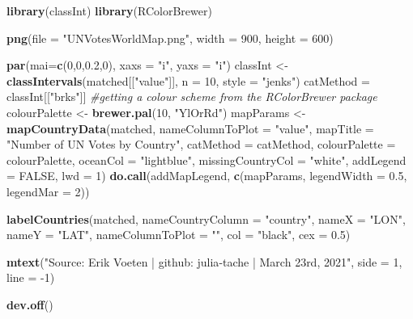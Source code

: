 \documentclass[
]{article}
\newenvironment{Shaded}{\begin{snugshade}}{\end{snugshade}}
\newcommand{\CommentTok}[1]{\textcolor[rgb]{0.56,0.35,0.01}{\textit{#1}}}
\newcommand{\DataTypeTok}[1]{\textcolor[rgb]{0.13,0.29,0.53}{#1}}
\newcommand{\DecValTok}[1]{\textcolor[rgb]{0.00,0.00,0.81}{#1}}
\newcommand{\FloatTok}[1]{\textcolor[rgb]{0.00,0.00,0.81}{#1}}
\newcommand{\KeywordTok}[1]{\textcolor[rgb]{0.13,0.29,0.53}{\textbf{#1}}}
\newcommand{\NormalTok}[1]{#1}
\newcommand{\OtherTok}[1]{\textcolor[rgb]{0.56,0.35,0.01}{#1}}
\newcommand{\StringTok}[1]{\textcolor[rgb]{0.31,0.60,0.02}{#1}}
\begin{document}
\begin{Shaded}
\begin{Highlighting}[]
\KeywordTok{library}\NormalTok{(classInt)}
\KeywordTok{library}\NormalTok{(RColorBrewer)}

\KeywordTok{png}\NormalTok{(}\DataTypeTok{file =} \StringTok{"UNVotesWorldMap.png"}\NormalTok{,}
    \DataTypeTok{width =} \DecValTok{900}\NormalTok{, }\DataTypeTok{height =} \DecValTok{600}\NormalTok{)}

\KeywordTok{par}\NormalTok{(}\DataTypeTok{mai=}\KeywordTok{c}\NormalTok{(}\DecValTok{0}\NormalTok{,}\DecValTok{0}\NormalTok{,}\FloatTok{0.2}\NormalTok{,}\DecValTok{0}\NormalTok{), }\DataTypeTok{xaxs =} \StringTok{"i"}\NormalTok{, }\DataTypeTok{yaxs =} \StringTok{"i"}\NormalTok{)}
\NormalTok{classInt \textless{}{-}}\StringTok{ }\KeywordTok{classIntervals}\NormalTok{(matched[[}\StringTok{"value"}\NormalTok{]], }\DataTypeTok{n =} \DecValTok{10}\NormalTok{, }\DataTypeTok{style =} \StringTok{"jenks"}\NormalTok{)}
\NormalTok{catMethod =}\StringTok{ }\NormalTok{classInt[[}\StringTok{"brks"}\NormalTok{]]}
\CommentTok{\#getting a colour scheme from the RColorBrewer package}
\NormalTok{colourPalette \textless{}{-}}\StringTok{ }\KeywordTok{brewer.pal}\NormalTok{(}\DecValTok{10}\NormalTok{, }\StringTok{"YlOrRd"}\NormalTok{)}
\NormalTok{mapParams \textless{}{-}}\StringTok{ }\KeywordTok{mapCountryData}\NormalTok{(matched,}
               \DataTypeTok{nameColumnToPlot =} \StringTok{"value"}\NormalTok{,}
               \DataTypeTok{mapTitle =} \StringTok{"Number of UN Votes by Country"}\NormalTok{,}
               \DataTypeTok{catMethod =}\NormalTok{ catMethod,}
               \DataTypeTok{colourPalette =}\NormalTok{ colourPalette,}
               \DataTypeTok{oceanCol =} \StringTok{"lightblue"}\NormalTok{,}
               \DataTypeTok{missingCountryCol =} \StringTok{"white"}\NormalTok{,}
               \DataTypeTok{addLegend =} \OtherTok{FALSE}\NormalTok{,}
               \DataTypeTok{lwd =} \DecValTok{1}\NormalTok{)}
\KeywordTok{do.call}\NormalTok{(addMapLegend, }\KeywordTok{c}\NormalTok{(mapParams, }\DataTypeTok{legendWidth =} \FloatTok{0.5}\NormalTok{, }\DataTypeTok{legendMar =} \DecValTok{2}\NormalTok{))}

\KeywordTok{labelCountries}\NormalTok{(matched, }
               \DataTypeTok{nameCountryColumn =} \StringTok{"country"}\NormalTok{, }
               \DataTypeTok{nameX =} \StringTok{"LON"}\NormalTok{, }
               \DataTypeTok{nameY =} \StringTok{"LAT"}\NormalTok{, }
               \DataTypeTok{nameColumnToPlot =} \StringTok{""}\NormalTok{, }
               \DataTypeTok{col =} \StringTok{"black"}\NormalTok{,}
               \DataTypeTok{cex =} \FloatTok{0.5}\NormalTok{)}

\KeywordTok{mtext}\NormalTok{(}\StringTok{"Source: Erik Voeten | github: julia{-}tache | March 23rd, 2021"}\NormalTok{, }\DataTypeTok{side =} \DecValTok{1}\NormalTok{, }\DataTypeTok{line =} \DecValTok{{-}1}\NormalTok{)}

\KeywordTok{dev.off}\NormalTok{()}
\end{Highlighting}
\end{Shaded}
\end{document}
